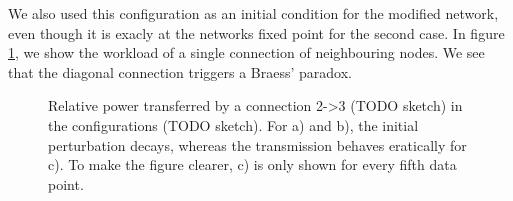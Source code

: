 \documentclass{scrartcl}
\begin{document}
We also used this configuration as an initial condition for the modified network, even though it is exacly at the networks fixed point for the second case. In figure \ref{fig:B31}, we show the workload of a single connection of neighbouring nodes. We see that the diagonal connection triggers a Braess' paradox.

\begin{figure}[h]
    \centering
    \caption{Relative power transferred by a connection 2->3 (TODO sketch) in the configurations (TODO sketch). For a) and b), the initial perturbation decays, whereas the transmission behaves eratically for c). To make the figure clearer, c) is only shown for every fifth data point. }
    \label{fig:B31}
\end{figure}
\end{document}
